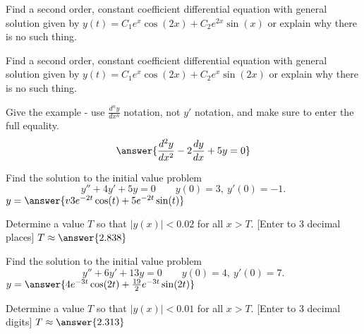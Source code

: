 \documentclass{ximera}
\begin{document}
\begin{exercise}%
    Find a second order, constant coefficient differential equation with general solution given by $y(t) = C_1e^{x} \cos(2x) + C_2e^{2x}\sin(x)$ or explain why there is no such thing.
    \begin{multipleChoice}
    \end{multipleChoice}
\end{exercise}

\begin{exercise}
    Find a second order, constant coefficient differential equation with general solution given by $y(t) = C_1e^{x} \cos(2x) + C_2e^{x}\sin(2x)$ or explain why there is no such thing.
    \begin{multipleChoice}
    \end{multipleChoice}
    \begin{problem}
        Give the example - use $\frac{d^ny}{dx^n}$ notation, not $y'$ notation, and make sure to enter the full equality.
        \[
            \answer{\frac{d^2y}{dx^2} -2\frac{dy}{dx} + 5y = 0}
        \]
    \end{problem}
\end{exercise}

\begin{exercise}
    Find the solution to the initial value problem 
    \[ 
        y'' + 4y' + 5y = 0 \qquad y(0) = 3,\ y'(0) = -1.
    \]
    $y = \answer{v3e^{-2t}\cos(t) + 5e^{-2t}\sin(t)}$
    \begin{problem}
        Determine a value $T$ so that $|y(x)| < 0.02$ for all $x > T$. [Enter to 3 decimal places] $T \approx \answer{2.838}$
    \end{problem}
\end{exercise}

\begin{exercise}
    Find the solution to the initial value problem 
    \[ 
        y'' + 6y' + 13y = 0 \qquad y(0) = 4,\ y'(0) = 7.
    \]
    $y = \answer{4e^{-3t}\cos(2t) + \frac{19}{2}e^{-3t}\sin(2t)}$
    \begin{problem}
        Determine a value $T$ so that $|y(x)| < 0.01$ for all $x > T$. [Enter to 3 decimal digits] $T \approx \answer{2.313}$
    \end{problem}
\end{exercise}
%
\end{document}
